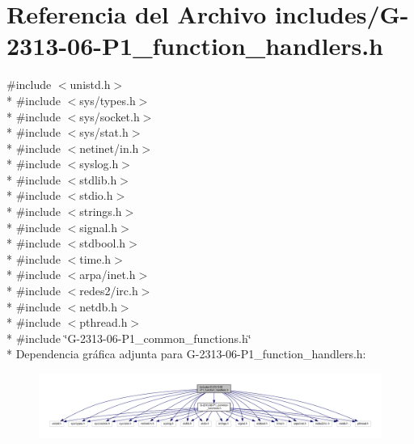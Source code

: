 \hypertarget{G-2313-06-P1__function__handlers_8h}{}\section{Referencia del Archivo includes/\+G-\/2313-\/06-\/\+P1\+\_\+function\+\_\+handlers.h}
\label{G-2313-06-P1__function__handlers_8h}
{\ttfamily \#include $<$unistd.\+h$>$}\\*
{\ttfamily \#include $<$sys/types.\+h$>$}\\*
{\ttfamily \#include $<$sys/socket.\+h$>$}\\*
{\ttfamily \#include $<$sys/stat.\+h$>$}\\*
{\ttfamily \#include $<$netinet/in.\+h$>$}\\*
{\ttfamily \#include $<$syslog.\+h$>$}\\*
{\ttfamily \#include $<$stdlib.\+h$>$}\\*
{\ttfamily \#include $<$stdio.\+h$>$}\\*
{\ttfamily \#include $<$strings.\+h$>$}\\*
{\ttfamily \#include $<$signal.\+h$>$}\\*
{\ttfamily \#include $<$stdbool.\+h$>$}\\*
{\ttfamily \#include $<$time.\+h$>$}\\*
{\ttfamily \#include $<$arpa/inet.\+h$>$}\\*
{\ttfamily \#include $<$redes2/irc.\+h$>$}\\*
{\ttfamily \#include $<$netdb.\+h$>$}\\*
{\ttfamily \#include $<$pthread.\+h$>$}\\*
{\ttfamily \#include \char`\"{}G-\/2313-\/06-\/\+P1\+\_\+common\+\_\+functions.\+h\char`\"{}}\\*
Dependencia gráfica adjunta para G-\/2313-\/06-\/\+P1\+\_\+function\+\_\+handlers.h\+:\nopagebreak
\begin{figure}[H]
\begin{center}
\leavevmode
\includegraphics[width=350pt]{G-2313-06-P1__function__handlers_8h__incl}
\end{center}
\end{figure}
